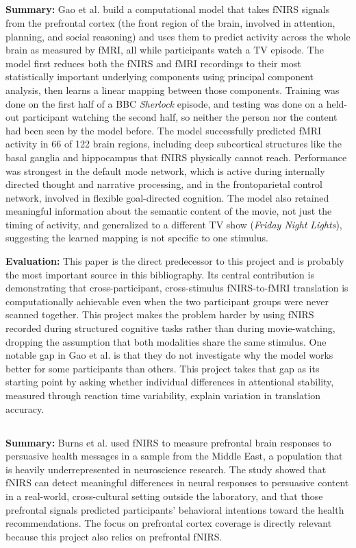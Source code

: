 \documentclass[12pt]{article}
\begin{document}
\subsection*{\cite{gao2025}}
\textbf{Summary:} Gao et al. build a computational model that takes fNIRS signals from the prefrontal cortex (the front region of the brain, involved in attention, planning, and social reasoning) and uses them to predict activity across the whole brain as measured by fMRI, all while participants watch a TV episode. The model first reduces both the fNIRS and fMRI recordings to their most statistically important underlying components using principal component analysis, then learns a linear mapping between those components. Training was done on the first half of a BBC \textit{Sherlock} episode, and testing was done on a held-out participant watching the second half, so neither the person nor the content had been seen by the model before. The model successfully predicted fMRI activity in 66 of 122 brain regions, including deep subcortical structures like the basal ganglia and hippocampus that fNIRS physically cannot reach. Performance was strongest in the default mode network, which is active during internally directed thought and narrative processing, and in the frontoparietal control network, involved in flexible goal-directed cognition. The model also retained meaningful information about the semantic content of the movie, not just the timing of activity, and generalized to a different TV show (\textit{Friday Night Lights}), suggesting the learned mapping is not specific to one stimulus.

\textbf{Evaluation:} This paper is the direct predecessor to this project and is probably the most important source in this bibliography. Its central contribution is demonstrating that cross-participant, cross-stimulus fNIRS-to-fMRI translation is computationally achievable even when the two participant groups were never scanned together. This project makes the problem harder by using fNIRS recorded during structured cognitive tasks rather than during movie-watching, dropping the assumption that both modalities share the same stimulus. One notable gap in Gao et al. is that they do not investigate why the model works better for some participants than others. This project takes that gap as its starting point by asking whether individual differences in attentional stability, measured through reaction time variability, explain variation in translation accuracy.

\subsection*{\cite{burns2019}}
\textbf{Summary:} Burns et al. used fNIRS to measure prefrontal brain responses to persuasive health messages in a sample from the Middle East, a population that is heavily underrepresented in neuroscience research. The study showed that fNIRS can detect meaningful differences in neural responses to persuasive content in a real-world, cross-cultural setting outside the laboratory, and that those prefrontal signals predicted participants' behavioral intentions toward the health recommendations. The focus on prefrontal cortex coverage is directly relevant because this project also relies on prefrontal fNIRS.
\end{document}
